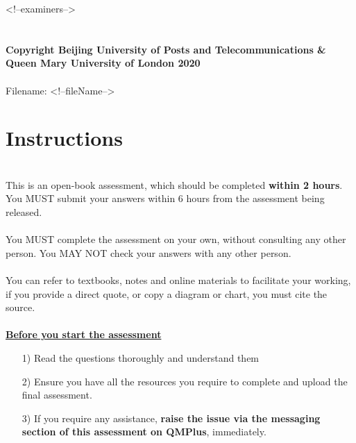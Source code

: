 \documentclass[11pt]{article}
\begin{document}
	\hspace{2em}<!--examiners-->
	~\\~\\~\\
	\textbf{\footnotesize Copyright  Beijing University of Posts and Telecommunications \&  Queen Mary University of London 2020}\\
	~\\
	Filename: <!--fileName-->
	
	
	\newpage
	\thispagestyle{empty}
	\part*{{\Large Instructions}}
	~\\
	This is an open-book assessment, which should be completed \textbf{within 2 hours}. You MUST submit your answers within 6 hours from the assessment being released.\\
	~\\
	
	You MUST complete the assessment on your own, without consulting any other person. You MAY NOT check your answers with any other person.\\
	~\\
	
	You can refer to textbooks, notes and online materials to facilitate your working, if you provide a direct quote, or copy a diagram or chart, you must cite the source.\\
	~\\
	
	\textbf{\underline{Before you start the assessment}}
	\begin{enumerate}
		\item[1) ] Read the questions thoroughly and understand them
		\item[2) ] Ensure you have all the resources you require to complete and upload the final assessment.
		\item[3) ] If you require any assistance, \textbf{raise the issue via the messaging section of this assessment on QMPlus}, immediately.
	\end{enumerate}
	~\\
	
\end{document}
